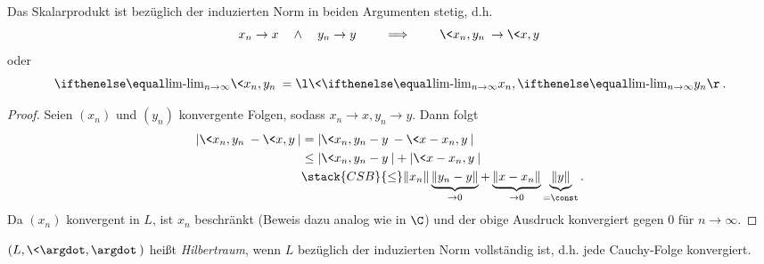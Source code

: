 \begin{kor} \label{1.4}
	Das Skalarprodukt ist bezüglich der induzierten Norm in beiden Argumenten stetig, d.h.
	\[
		x_n \to x \quad\land\quad y_n \to y
		\qquad \implies \qquad
		\<x_n, y_n\> \to \<x,y\>
	\]
	oder
	\[
		\lim_{n\to \infty} \<x_n, y_n\> = \l\<\lim_{n\to \infty} x_n, \lim_{n\to\infty} y_n \r\>.
	\]
	\begin{proof}
	Seien $ (x_n) $ und $ (y_n) $ konvergente Folgen, sodass $ x_n \to x, y_n \to y $. Dann folgt
		\begin{align*}
			|\<x_n,y_n\> - \<x,y\>|
			&= |\<x_n, y_n - y\> - \<x-x_n,y\>| \\
			&\le |\<x_n,y_n -y\>| + |\<x-x_n,y\>| \\
			&\stack{CSB}{\le} \|x_n\| \underbrace{\|y_n -y\|}_{\to 0} + \underbrace{\|x-x_n\|}_{\to 0} \underbrace{\|y\|}_{=\const}.
			\end{align*}
		Da $(x_n)$ konvergent in $L$, ist $x_n$ beschränkt (Beweis dazu analog wie in $\C$) und der obige Ausdruck konvergiert gegen $ 0 $ für $ n\to \infty $.
	\end{proof}
\end{kor}

\begin{df}[Hilbertraum] \label{1.5}
	$(L, \<\argdot, \argdot\>)$ heißt \emph{Hilbertraum}, wenn $L$ bezüglich der induzierten Norm vollständig ist, d.h. jede Cauchy-Folge konvergiert.
\end{df}

